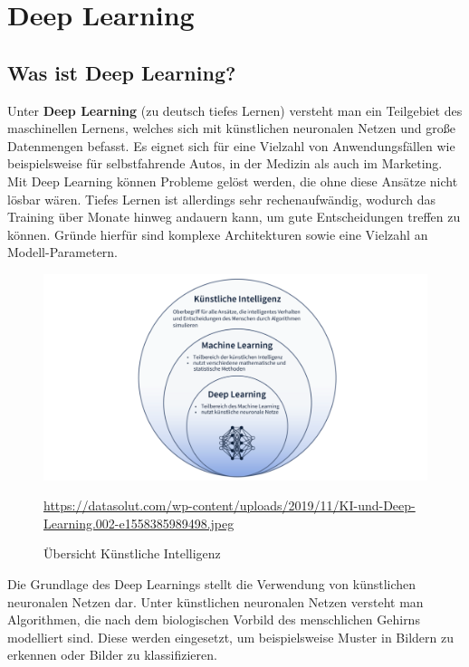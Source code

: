 \chapter{Deep Learning}

\section{Was ist Deep Learning?}

Unter \textbf{Deep Learning} (zu deutsch tiefes Lernen) versteht man ein Teilgebiet des maschinellen Lernens, welches sich mit künstlichen neuronalen Netzen und große Datenmengen befasst. Es eignet sich für eine Vielzahl von Anwendungsfällen wie beispielsweise für selbstfahrende Autos, in der Medizin als auch im Marketing. \cite{datasolut2}\\

Mit Deep Learning können Probleme gelöst werden, die ohne diese Ansätze nicht lösbar wären. Tiefes Lernen ist allerdings sehr rechenaufwändig, wodurch das Training über Monate hinweg andauern kann, um gute Entscheidungen treffen zu können. Gründe hierfür sind komplexe Architekturen sowie eine Vielzahl an Modell-Parametern. \cite{datasolut2} \\

\begin{figure}[H]
	\centering
	\includegraphics[width=\textwidth]{kapitel3/images/KI_Uebersicht.png}
	\caption{Übersicht Künstliche Intelligenz}
	\vspace{0.2cm}
	\quelle\url{https://datasolut.com/wp-content/uploads/2019/11/KI-und-Deep-Learning.002-e1558385989498.jpeg}
\end{figure}

Die Grundlage des Deep Learnings stellt die Verwendung von künstlichen neuronalen Netzen dar. Unter künstlichen neuronalen Netzen versteht man Algorithmen, die nach dem biologischen Vorbild des menschlichen Gehirns modelliert sind. Diese werden eingesetzt, um beispielsweise Muster in Bildern zu erkennen oder Bilder zu klassifizieren. \cite{datasolut2}\\

